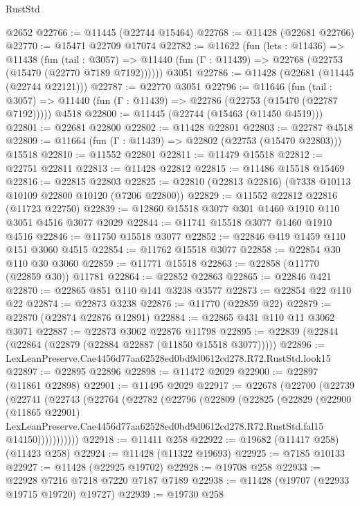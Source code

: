\begin{lexlean}{RustStd}
\begin{coremodule}
    @2652
@22766 := @11445 (@22744 @15464)
@22768 := @11428 (@22681 @22766)
@22770 := @15471 @22709 @17074
@22782 := @11622
    (fun (lets : @11436) =>
    @11438
      (fun (tail : @3057) =>
      @11440 (fun (Γ : @11439) => @22768 (@22753 (@15470 (@22770 @7189 @7192))))))
    @3051
@22786 := @11428 (@22681 (@11445 (@22744 @22121)))
@22787 := @22770 @3051
@22796 := @11646
    (fun (tail : @3057) => @11440 (fun (Γ : @11439) => @22786 (@22753 (@15470 (@22787 @7192)))))
    @4518
@22800 := @11445 (@22744 (@15463 (@11450 @4519)))
@22801 := @22681 @22800
@22802 := @11428 @22801
@22803 := @22787 @4518
@22809 := @11664 (fun (Γ : @11439) => @22802 (@22753 (@15470 @22803))) @15518
@22810 := @11552 @22801
@22811 := @11479 @15518
@22812 := @22751 @22811
@22813 := @11428 @22812
@22815 := @11486 @15518 @15469
@22816 := @22815 @22803
@22825 := @22810 (@22813 @22816) (@7338 @10113 @10109 @22800 @10120 (@7206 @22800))
@22829 := @11552 @22812 @22816 (@11723 @22750)
@22839 := @12860 @15518 @3077 @301 @1460 @1910 @110 @3051 @4516 @3077 @2029
@22844 := @11741 @15518 @3077 @1460 @1910 @4516
@22846 := @11750 @15518 @3077
@22852 := @22846 @419 @1459 @110 @151 @3060 @4515
@22854 := @11762 @15518 @3077
@22858 := @22854 @30 @110 @30 @3060
@22859 := @11771 @15518
@22863 := @22858 (@11770 (@22859 @30)) @11781
@22864 := @22852 @22863
@22865 := @22846 @421
@22870 := @22865 @851 @110 @141 @3238 @3577
@22873 := @22854 @22 @110 @22
@22874 := @22873 @3238
@22876 := @11770 (@22859 @22)
@22879 := @22870 (@22874 @22876 @12891)
@22884 := @22865 @431 @110 @11 @3062 @3071
@22887 := @22873 @3062 @22876 @11798
@22895 := @22839 (@22844 (@22864 (@22879 (@22884 @22887 (@11850 @15518 @3077)))))
@22896 := LexLeanPreserve.Cae4456d77aa62528ed0bd9d0612cd278.R72.RustStd.look15
@22897 := @22895 @22896
@22898 := @11472 @2029
@22900 := @22897 (@11861 @22898)
@22901 := @11495 @2029
@22917 := @22678
    (@22700
      (@22739
        (@22741
          (@22743
            (@22764
              (@22782
                (@22796
                  (@22809
                    (@22825
                      (@22829
                        (@22900
                          (@11865 @22901)
                          LexLeanPreserve.Cae4456d77aa62528ed0bd9d0612cd278.R72.RustStd.fal15
                          @14150)))))))))))
@22918 := @11411 @258
@22922 := @19682 (@11417 @258) (@11423 @258)
@22924 := @11428 (@11322 @19693)
@22925 := @7185 @10133
@22927 := @11428 (@22925 @19702)
@22928 := @19708 @258
@22933 := @22928 @7216 @7218 @7220 @7187 @7189
@22938 := @11428 (@19707 (@22933 @19715 @19720) @19727)
@22939 := @19730 @258

\end{coremodule}
\end{lexlean}
